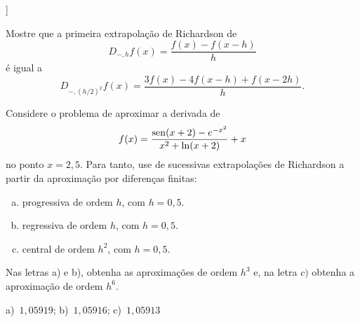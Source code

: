 \begin{flushleft}
  [[tag:revisar]]
\end{flushleft}

\begin{exer}
  Mostre que a primeira extrapolação de Richardson de
  \begin{equation}
    D_{-,h}f(x) = \frac{f(x)-f(x-h)}{h}
  \end{equation}
é igual a
\begin{equation}
  D_{-,(h/2)^2}f(x) = \frac{3f(x)-4f(x-h)+f(x-2h)}{h}.
\end{equation}
\end{exer}

\begin{exer}\label{exer:df_fun}
  Considere o problema de aproximar a derivada de 
  \begin{equation}
    f(x) = \frac{\operatorname{sen}(x+2) - e^{-x^2}}{x^2 + \ln(x+2)}+x
  \end{equation}
no ponto $x=2,5$. Para tanto, use de sucessivas extrapolações de Richardson a partir da aproximação por diferenças finitas:
\begin{enumerate}[a)]
\item progressiva de ordem $h$, com $h=0,5$.
\item regressiva de ordem $h$, com $h=0,5$.
\item central de ordem $h^2$, com $h=0,5$.
\end{enumerate}
Nas letras a) e b), obtenha as aproximações de ordem $h^3$ e, na letra $c)$ obtenha a aproximação de ordem $h^6$.
\end{exer}
\begin{resp}
  a)~$1,05919$; b)~$1,05916$; c)~$1,05913$
\end{resp}
